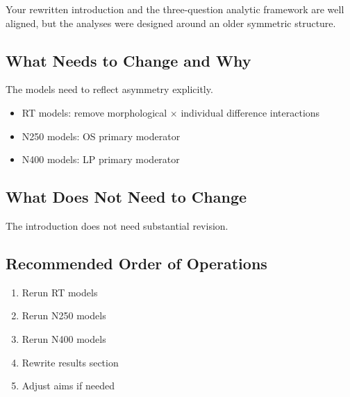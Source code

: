\documentclass[12pt]{article}
\begin{document}
	Your rewritten introduction and the three-question analytic framework are well aligned, but the analyses were designed around an older symmetric structure.
	
	\subsection{What Needs to Change and Why}
	
	The models need to reflect asymmetry explicitly.
	
	\begin{itemize}[leftmargin=*]
		\item RT models: remove morphological $\times$ individual difference interactions
		\item N250 models: OS primary moderator
		\item N400 models: LP primary moderator
	\end{itemize}
	
	\subsection{What Does Not Need to Change}
	
	The introduction does not need substantial revision.
	
	\subsection{Recommended Order of Operations}
	
	\begin{enumerate}[leftmargin=*]
		\item Rerun RT models
		\item Rerun N250 models
		\item Rerun N400 models
		\item Rewrite results section
		\item Adjust aims if needed
	\end{enumerate}
	
\end{document}
